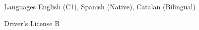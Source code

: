 

\begin{cvskills}

\cvskill
  {Languages}
  {English (C1), Spanish (Native), Catalan (Bilingual)}

\cvskill
  {Driver's License}
  {B}

\end{cvskills}
